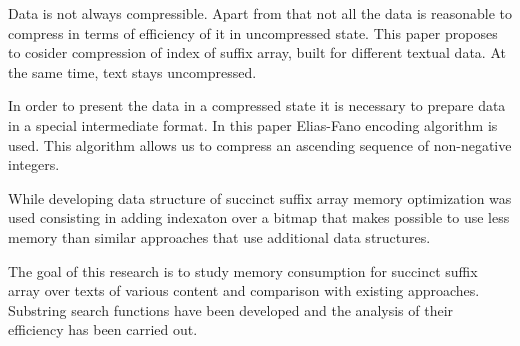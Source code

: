 Data is not always compressible. Apart from that not all the data is reasonable to compress
in terms of efficiency of it in uncompressed state. This paper proposes to cosider compression of index of suffix array,
built for different textual data. At the same time, text stays uncompressed.

In order to present the data in a compressed state it is necessary to prepare data in a special intermediate format.
In this paper Elias-Fano encoding algorithm \cite{pibiri2014dynamic} is used.
This algorithm allows us to compress an ascending sequence of non-negative integers.

While developing data structure of succinct suffix array memory optimization was used consisting in adding indexaton
over a bitmap that makes possible to use less memory than similar approaches that use additional data structures.

The goal of this research is to study memory consumption for succinct suffix array over texts of various content
and comparison with existing approaches.
Substring search functions have been developed and the analysis of their efficiency has been carried out.
